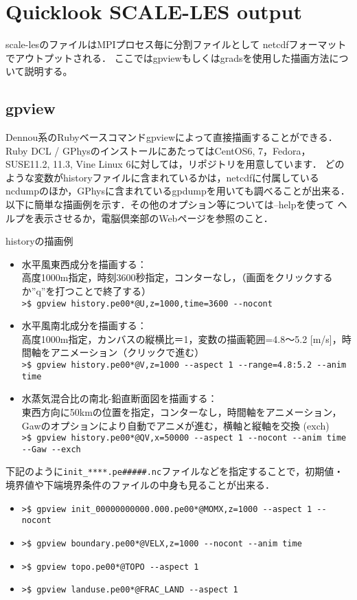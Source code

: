 \section{Quicklook SCALE-LES output}

scale-lesのファイルはMPIプロセス毎に分割ファイルとして
netcdfフォーマットでアウトプットされる．
ここではgpviewもしくはgradsを使用した描画方法について説明する。

\subsection{gpview}

Dennou系のRubyベースコマンドgpviewによって直接描画することができる．
Ruby DCL / GPhysのインストールにあたってはCentOS6, 7，Fedora，SUSE11.2,
11.3, Vine Linux 6に対しては，リポジトリを用意しています．
どのような変数がhistoryファイルに含まれているかは，netcdfに付属している
ncdumpのほか，GPhysに含まれているgpdumpを用いても調べることが出来る．
以下に簡単な描画例を示す．その他のオプション等については--helpを使って
ヘルプを表示させるか，電脳倶楽部のWebページを参照のこと．

historyの描画例
\begin{itemize}
\item 水平風東西成分を描画する：\\
高度1000m指定，時刻3600秒指定，コンターなし，（画面をクリックするか''q''を打つことで終了する）\\
\verb|>$ gpview history.pe00*@U,z=1000,time=3600 --nocont|
\item 水平風南北成分を描画する：\\
高度1000m指定，カンバスの縦横比＝1，変数の描画範囲=4.8～5.2 [m/s]，時間軸をアニメーション（クリックで進む）\\
\verb|>$ gpview history.pe00*@V,z=1000 --aspect 1 --range=4.8:5.2 --anim time|
\item 水蒸気混合比の南北-鉛直断面図を描画する：\\
東西方向に50kmの位置を指定，コンターなし，時間軸をアニメーション，Gawのオプションにより自動でアニメが進む，横軸と縦軸を交換 (exch)\\
\verb|>$ gpview history.pe00*@QV,x=50000 --aspect 1 --nocont --anim time --Gaw --exch|
\end{itemize}

下記のように\verb|init_****.pe#####.nc|ファイルなどを指定することで，初期値・境界値や下端境界条件のファイルの中身も見ることが出来る．
\begin{itemize}
\item \verb|>$ gpview init_00000000000.000.pe00*@MOMX,z=1000 --aspect 1 --nocont|
\item \verb|>$ gpview boundary.pe00*@VELX,z=1000 --nocont --anim time|
\item \verb|>$ gpview topo.pe00*@TOPO --aspect 1|
\item \verb|>$ gpview landuse.pe00*@FRAC_LAND --aspect 1|
\end{itemize}

